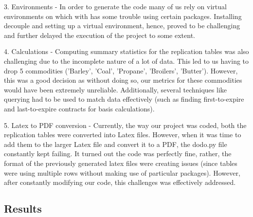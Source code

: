 \documentclass{article}
\begin{document}
3. Environments - In order to generate the code many of us rely on virtual environments on which with has some trouble using certain packages. Installing decouple and setting up a virtual environment, hence, proved to be challenging and further delayed the execution of the project to some extent.

4. Calculations - Computing summary statistics for the replication tables was also challenging due to the incomplete nature of a lot of data. This led to us having to drop 5 commodities ('Barley', 'Coal', 'Propane', 'Broilers', 'Butter'). However, this was a good decision as without doing so, our metrics for these commodities would have been extremely unreliable. Additionally, several techniques like querying had to be used to match data effectively (such as finding first-to-expire and last-to-expire contracts for basis calculations). 

5. Latex to PDF conversion - Currently, the way our project was coded, both the replication tables were converted into Latex files. However, when it was time to add them to the larger Latex file and convert it to a PDF, the dodo.py file constantly kept failing. It turned out the code was perfectly fine, rather, the format of the previously generated latex files were creating issues (since tables were using multiple rows without making use of particular packages). However, after constantly modifying our code, this challenges was effectively addressed.

\newpage

\subsection{Results}
\end{document}
